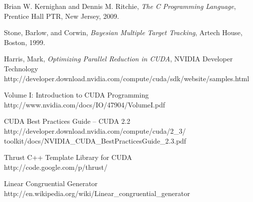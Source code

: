 \documentclass{article}
\begin{document}
\begin{thebibliography}{9}

  Brian W. Kernighan and Dennis M. Ritchie,
  \emph{The C Programming Language},
  Prentice Hall PTR, New Jersey,
  2009.

  Stone, Barlow, and Corwin,
  \emph{Bayesian Multiple Target Tracking},
  Artech House, Boston,
  1999.

   Harris, Mark,
   \emph{Optimizing Parallel Reduction in CUDA},
   NVIDIA Developer Technology \\
   http://developer.download.nvidia.com/compute/cuda/sdk/website/samples.html

   Volume I: Introduction to CUDA Programming \\
   http://www.nvidia.com/docs/IO/47904/VolumeI.pdf

   CUDA Best Practices Guide -- CUDA 2.2\\
   http://developer.download.nvidia.com/compute/cuda/2\_3/\\
   toolkit/docs/NVIDIA\_CUDA\_BestPracticesGuide\_2.3.pdf

   Thrust C++ Template Library for CUDA \\
   http://code.google.com/p/thrust/

   Linear Congruential Generator \\
   http://en.wikipedia.org/wiki/Linear\_congruential\_generator

\end{thebibliography}
\end{document}
